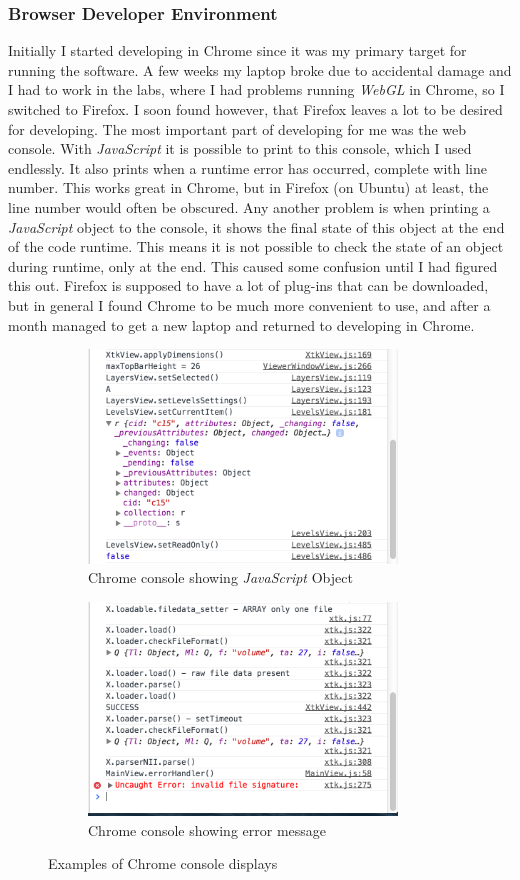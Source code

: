 \documentclass[a4paper,11pt,twoside]{article}
\begin{document}
\subsubsection{Browser Developer Environment}

Initially I started developing in Chrome since it was my primary target for running the software. A few weeks my laptop broke due to accidental damage and I had to work in the labs, where I had problems running \textit{WebGL} in Chrome, so I switched to Firefox. I soon found however, that Firefox leaves a lot to be desired for developing. The most important part of developing for me was the web console. With \textit{JavaScript} it is possible to print to this console, which I used endlessly. It also prints when a runtime error has occurred, complete with line number. This works great in Chrome, but in Firefox (on Ubuntu) at least, the line number would often be obscured. Any another problem is when printing a \textit{JavaScript} object to the console, it shows the final state of this object at the end of the code runtime. This means it is not possible to check the state of an object during runtime, only at the end. This caused some confusion until I had figured this out. Firefox is supposed to have a lot of plug-ins that can be downloaded, but in general I found Chrome to be much more convenient to use, and after a month managed to get a new laptop and returned to developing in Chrome.


\begin{figure}
\centering
\begin{subfigure}{.5\textwidth}
  \centering
  \includegraphics[width=82mm]{graphics/console_01.png}
  \caption{Chrome console showing \textit{JavaScript} Object}
\end{subfigure}%
\begin{subfigure}{.5\textwidth}
  \centering
  \includegraphics[width=82mm]{graphics/console_02.png}
  \caption{Chrome console showing error message}
\end{subfigure}
\caption{Examples of Chrome console displays}

\end{figure}
\end{document}
